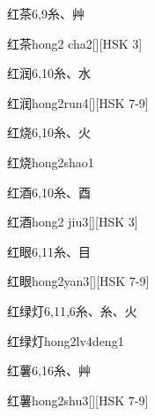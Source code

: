 \begin{Entry}{红茶}{6,9}{⽷、⾋}
  \begin{Phonetics}{红茶}{hong2 cha2}[][HSK 3]
  \end{Phonetics}
\end{Entry}

\begin{Entry}{红润}{6,10}{⽷、⽔}
  \begin{Phonetics}{红润}{hong2run4}[][HSK 7-9]
  \end{Phonetics}
\end{Entry}

\begin{Entry}{红烧}{6,10}{⽷、⽕}
  \begin{Phonetics}{红烧}{hong2shao1}
  \end{Phonetics}
\end{Entry}

\begin{Entry}{红酒}{6,10}{⽷、⾣}
  \begin{Phonetics}{红酒}{hong2 jiu3}[][HSK 3]
  \end{Phonetics}
\end{Entry}

\begin{Entry}{红眼}{6,11}{⽷、⽬}
  \begin{Phonetics}{红眼}{hong2yan3}[][HSK 7-9]
  \end{Phonetics}
\end{Entry}

\begin{Entry}{红绿灯}{6,11,6}{⽷、⽷、⽕}
  \begin{Phonetics}{红绿灯}{hong2lv4deng1}
  \end{Phonetics}
\end{Entry}

\begin{Entry}{红薯}{6,16}{⽷、⾋}
  \begin{Phonetics}{红薯}{hong2shu3}[][HSK 7-9]
  \end{Phonetics}
\end{Entry}

